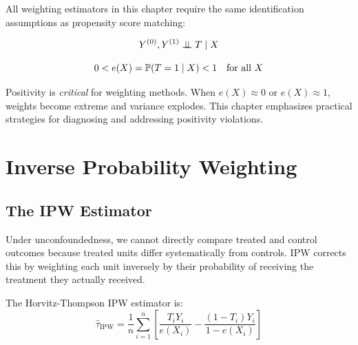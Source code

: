 All weighting estimators in this chapter require the same identification assumptions as propensity score matching:

\begin{assumption}[Unconfoundedness]
\begin{equation}
Y^{(0)}, Y^{(1)} \perp\!\!\!\perp T \mid X
\end{equation}
\end{assumption}

\begin{assumption}
\begin{equation}
0 < e(X) = \mathbb{P}(T = 1 \mid X) < 1 \quad \text{for all } X
\end{equation}
\end{assumption}

\begin{insight}
Positivity is \emph{critical} for weighting methods. When $e(X) \approx 0$ or $e(X) \approx 1$, weights become extreme and variance explodes. This chapter emphasizes practical strategies for diagnosing and addressing positivity violations.
\end{insight}

\section{Inverse Probability Weighting}
\label{sec:ipw}

\subsection{The IPW Estimator}

Under unconfoundedness, we cannot directly compare treated and control outcomes because treated units differ systematically from controls. IPW corrects this by weighting each unit inversely by their probability of receiving the treatment they actually received.

\begin{definition}
The Horvitz-Thompson IPW estimator is:
\begin{equation}
\hat{\tau}_{\text{IPW}} = \frac{1}{n}\sum_{i=1}^{n} \left[ \frac{T_i Y_i}{e(X_i)} - \frac{(1-T_i) Y_i}{1 - e(X_i)} \right]
\label{eq:ipw_ate}
\end{equation}
\end{definition}

